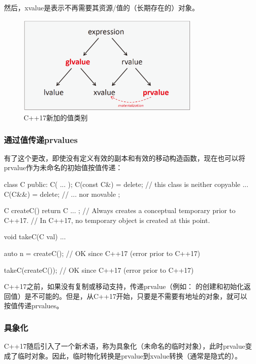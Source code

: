 然后，xvalue是表示不再需要其资源/值的（长期存在的）对象。

\begin{figure}
	\includegraphics[width=0.8\textwidth]{part1/ch8/images/2}
	\caption{C++17新加的值类别}
\end{figure}

\subsubsection{通过值传递prvalues}

有了这个更改，即使没有定义有效的副本和有效的移动构造函数，现在也可以将prvalue作为未命名的初始值按值传递：

\begin{cppcode}
class C {
	public:
	C( ... );
	C(const C&) = delete; // this class is neither copyable ...
	C(C&&) = delete; // ... nor movable
};

C createC() {
	return C{ ... }; // Always creates a conceptual temporary prior to C++17.
} // In C++17, no temporary object is created at this point.

void takeC(C val) {
	...
}

auto n = createC(); // OK since C++17 (error prior to C++17)

takeC(createC()); // OK since C++17 (error prior to C++17)
\end{cppcode}

C++17之前，如果没有复制或移动支持，传递prvalue（例如： 的创建和初始化返回值）是不可能的。但是，从C++17开始，只要是不需要有地址的对象，就可以按值传递prvalues。

\subsubsection{具象化}

C++17随后引入了一个新术语，称为具象化（未命名的临时对象），此时prvalue变成了临时对象。因此，临时物化转换是prvalue到xvalue转换（通常是隐式的）。

